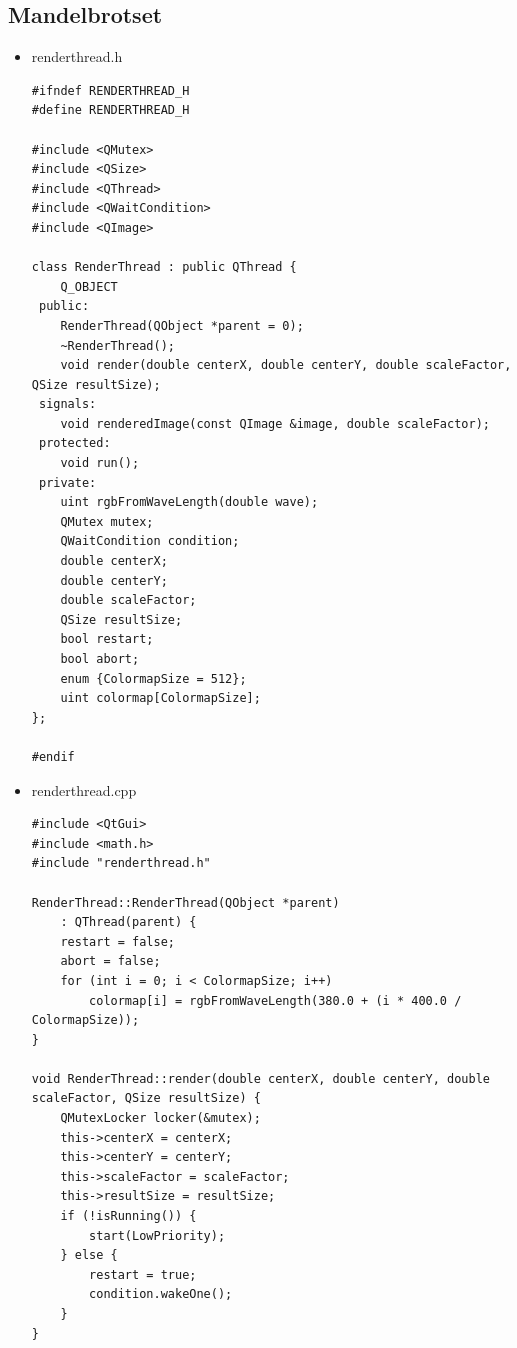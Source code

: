 \documentclass[9pt,b5paper]{article}
\begin{document}
\subsection{Mandelbrotset}
\label{sec-6-5}
\begin{itemize}
\item renderthread.h

\lstset{language=java,label= ,caption= ,numbers=none}
\begin{lstlisting}
#ifndef RENDERTHREAD_H
#define RENDERTHREAD_H

#include <QMutex>
#include <QSize>
#include <QThread>
#include <QWaitCondition>
#include <QImage>

class RenderThread : public QThread {
    Q_OBJECT
 public:
    RenderThread(QObject *parent = 0);
    ~RenderThread();
    void render(double centerX, double centerY, double scaleFactor, QSize resultSize);
 signals:
    void renderedImage(const QImage &image, double scaleFactor);
 protected:
    void run();
 private:
    uint rgbFromWaveLength(double wave);
    QMutex mutex;
    QWaitCondition condition;
    double centerX;
    double centerY;
    double scaleFactor;
    QSize resultSize;
    bool restart;
    bool abort;
    enum {ColormapSize = 512};
    uint colormap[ColormapSize];
};

#endif
\end{lstlisting}
\item renderthread.cpp

\lstset{language=java,label= ,caption= ,numbers=none}
\begin{lstlisting}
#include <QtGui>
#include <math.h>
#include "renderthread.h"

RenderThread::RenderThread(QObject *parent)
    : QThread(parent) {
    restart = false;
    abort = false;
    for (int i = 0; i < ColormapSize; i++)
        colormap[i] = rgbFromWaveLength(380.0 + (i * 400.0 / ColormapSize));
}

void RenderThread::render(double centerX, double centerY, double scaleFactor, QSize resultSize) {
    QMutexLocker locker(&mutex);
    this->centerX = centerX;
    this->centerY = centerY;
    this->scaleFactor = scaleFactor;
    this->resultSize = resultSize;
    if (!isRunning()) {
        start(LowPriority);
    } else {
        restart = true;
        condition.wakeOne();
    }
}


\end{lstlisting}
\end{itemize}
\end{document}
